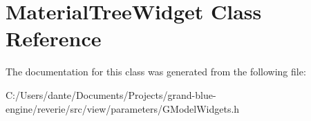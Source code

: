 \hypertarget{class_material_tree_widget}{}\section{Material\+Tree\+Widget Class Reference}
\label{class_material_tree_widget}


The documentation for this class was generated from the following file\+:\begin{DoxyCompactItemize}
\item 
C\+:/\+Users/dante/\+Documents/\+Projects/grand-\/blue-\/engine/reverie/src/view/parameters/G\+Model\+Widgets.\+h\end{DoxyCompactItemize}
